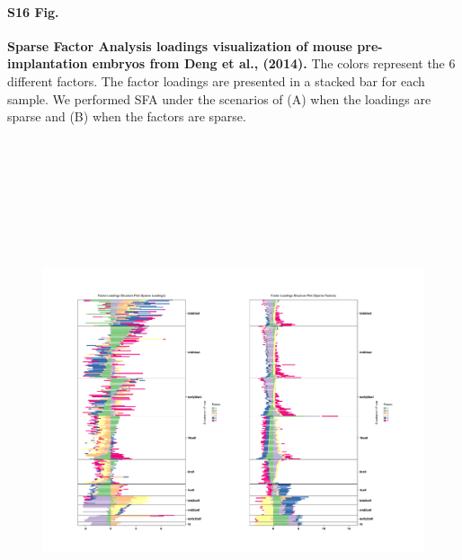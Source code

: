 \documentclass[10pt,letterpaper]{article}
\begin{document}
\paragraph*{S16 Fig.}

\label{figS16}
{\bf Sparse Factor Analysis loadings visualization of mouse pre-implantation embryos from Deng et al., (2014).} The colors represent the 6 different factors. The factor loadings are presented in a stacked bar for each sample. We performed SFA under the scenarios of (A) when the loadings are sparse and (B) when the factors are sparse.


\begin{figure}[ht]
\centering
\includegraphics[height=6.3in, width=7in]{../../plots/deng-figures/sfa_deng_figs.pdf}
\end{figure}
\end{document}
